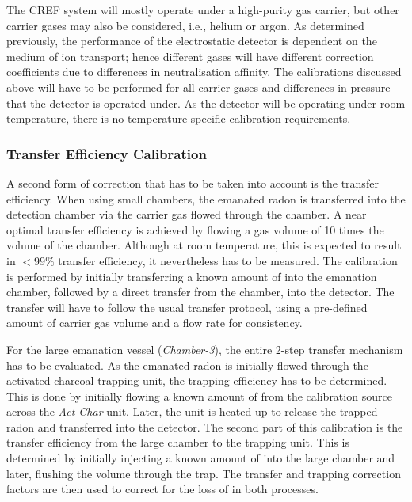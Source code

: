 The CREF system will mostly operate under a high-purity \nitrogen{} gas carrier, but other carrier gases may also be considered, i.e., helium or argon. As determined previously, the performance of the electrostatic detector is dependent on the medium of ion transport; hence different gases will have different correction coefficients due to differences in neutralisation affinity. The calibrations discussed above will have to be performed for all carrier gases and differences in pressure that the detector is operated under. As the detector will be operating under room temperature, there is no temperature-specific calibration requirements.


\subsubsection{Transfer Efficiency Calibration}

A second form of correction that has to be taken into account is the transfer efficiency. When using small chambers, the emanated radon is transferred into the detection chamber via the carrier gas flowed through the chamber. A near optimal transfer efficiency is achieved by flowing a gas volume of 10 times the volume of the chamber. Although at room temperature, this is expected to result in $<99\%$ transfer efficiency, it nevertheless has to be measured. The calibration is performed by initially transferring a known amount of \RnTTT{} into the emanation chamber, followed by a direct transfer from the chamber, into the detector. The transfer will have to follow the usual transfer protocol, using a pre-defined amount of carrier gas volume and a flow rate for consistency. 

For the large emanation vessel (\textit{Chamber-3}), the entire 2-step transfer mechanism has to be evaluated. As the emanated radon is initially flowed through the activated charcoal trapping unit, the trapping efficiency has to be determined. This is done by initially flowing a known amount of \RnTTT{} from the calibration source across the \textit{Act Char} unit. Later, the unit is heated up to release the trapped radon and transferred into the detector. The second part of this calibration is the transfer efficiency from the large chamber to the trapping unit. This is determined by initially injecting a known amount of \RnTTT{} into the large chamber and later, flushing the volume through the trap. The transfer and trapping correction factors are then used to correct for the loss of \RnTTT{} in both processes.

